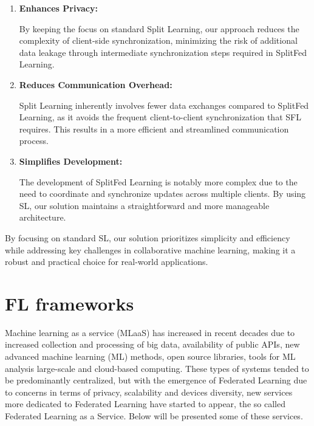 \begin{enumerate}
	\item \textbf{Enhances Privacy: }
	
	By keeping the focus on standard Split Learning, our approach reduces the complexity of client-side synchronization, minimizing the risk of additional data leakage through intermediate synchronization steps required in SplitFed Learning.
	
	\item \textbf{Reduces Communication Overhead:}
	
	Split Learning inherently involves fewer data exchanges compared to SplitFed Learning, as it avoids the frequent client-to-client synchronization that \gls{SFL} requires. This results in a more efficient and streamlined communication process.

	\item \textbf{Simplifies Development:} 
	
	The development of SplitFed Learning is notably more complex due to the need to coordinate and synchronize updates across multiple clients. By using SL, our solution maintains a straightforward and more manageable architecture.
	
\end{enumerate}

By focusing on standard \gls{SL}, our solution prioritizes simplicity and efficiency while addressing key challenges in collaborative machine learning, making it a robust and practical choice for real-world applications.



\section{FL frameworks}
\label{sec:fl_apps_and_frameworks}

Machine learning as a service (MLaaS) has increased in recent decades due to increased collection and processing of big data, availability of public APIs, new advanced machine learning (\gls{ML}) methods, open source libraries, tools for \gls{ML} analysis large-scale and cloud-based computing. These types of systems tended to be predominantly centralized, but with the emergence of Federated Learning due to concerns in terms of privacy, scalability and devices diversity, new services more dedicated to Federated Learning have started to appear, the so called Federated Learning as a Service. Below will be presented some of these services.


